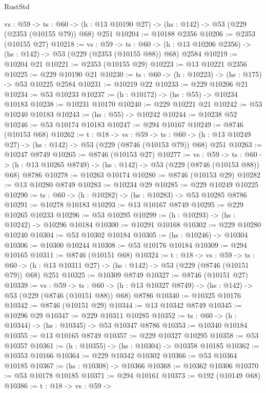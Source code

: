 \begin{lexlean}{RustStd}
\begin{coremodule}
  {vs : @59} ->
  {ts : @60} -> (h : @13 @10190 @27) -> (hs : @142) -> @53 (@229 (@2353 (@10155 @79)) @68) @251
@10204 := @10188 @2356
@10206 := @2353 (@10155 @27)
@10218 := {vs : @59} ->
  {ts : @60} -> (h : @13 @10206 @2356) -> (hs : @142) -> @53 (@229 (@2353 (@10155 @88)) @68) @2584
@10219 := @10204 @21
@10221 := @2353 (@10155 @29)
@10223 := @13 @10221 @2356
@10225 := @229 @10190 @21
@10230 := {ts : @60} -> (h : @10223) -> (hs : @175) -> @53 @10225 @2584
@10231 := @10219 @22
@10233 := @229 @10206 @21
@10234 := @53 @10233
@10237 := (h : @10172) -> (hs : @55) -> @10234 @10183
@10238 := @10231 @10170
@10240 := @229 @10221 @21
@10242 := @53 @10240 @10183
@10243 := (hs : @55) -> @10242
@10244 := @10238 @52
@10246 := @53 @10174 @10183
@10247 := @294 @10167
@10249 := @8746 (@10153 @68)
@10262 := {t : @18} ->
  {vs : @59} ->
  {ts : @60} -> (h : @13 @10249 @27) -> (hs : @142) -> @53 (@229 (@8746 (@10153 @79)) @68) @251
@10263 := @10247 @8749
@10265 := @8746 (@10153 @27)
@10277 := {vs : @59} ->
  {ts : @60} -> (h : @13 @10265 @8749) -> (hs : @142) -> @53 (@229 (@8746 (@10153 @88)) @68) @8786
@10278 := @10263 @10174
@10280 := @8746 (@10153 @29)
@10282 := @13 @10280 @8749
@10283 := @10234 @29
@10285 := @229 @10249 @10225
@10290 := {ts : @60} -> (h : @10282) -> (hs : @10283) -> @53 @10285 @8786
@10291 := @10278 @10183
@10293 := @13 @10167 @8749
@10295 := @229 @10265 @10233
@10296 := @53 @10295
@10299 := (h : @10293) -> (hs : @10242) -> @10296 @10184
@10300 := @10291 @10168
@10302 := @229 @10280 @10240
@10304 := @53 @10302 @10184
@10305 := (hs : @10246) -> @10304
@10306 := @10300 @10244
@10308 := @53 @10176 @10184
@10309 := @294 @10165
@10311 := @8746 (@10151 @68)
@10324 := {t : @18} ->
  {vs : @59} ->
  {ts : @60} -> (h : @13 @10311 @27) -> (hs : @142) -> @53 (@229 (@8746 (@10151 @79)) @68) @251
@10325 := @10309 @8749
@10327 := @8746 (@10151 @27)
@10339 := {vs : @59} ->
  {ts : @60} -> (h : @13 @10327 @8749) -> (hs : @142) -> @53 (@229 (@8746 (@10151 @88)) @68) @8786
@10340 := @10325 @10176
@10342 := @8746 (@10151 @29)
@10344 := @13 @10342 @8749
@10345 := @10296 @29
@10347 := @229 @10311 @10285
@10352 := {ts : @60} -> (h : @10344) -> (hs : @10345) -> @53 @10347 @8786
@10353 := @10340 @10184
@10355 := @13 @10165 @8749
@10357 := @229 @10327 @10295
@10358 := @53 @10357
@10361 := (h : @10355) -> (hs : @10304) -> @10358 @10185
@10362 := @10353 @10166
@10364 := @229 @10342 @10302
@10366 := @53 @10364 @10185
@10367 := (hs : @10308) -> @10366
@10368 := @10362 @10306
@10370 := @53 @10178 @10185
@10371 := @294 @10161
@10373 := @192 (@10149 @68)
@10386 := {t : @18} ->
  {vs : @59} ->

\end{coremodule}
\end{lexlean}
